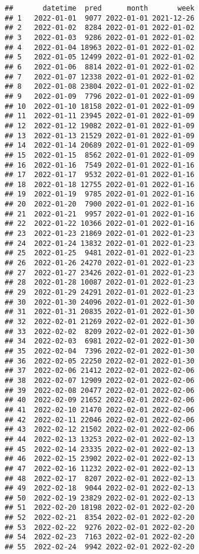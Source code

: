 \documentclass[
]{article}
\begin{document}
\begin{verbatim}
##       datetime  pred      month       week
## 1   2022-01-01  9077 2022-01-01 2021-12-26
## 2   2022-01-02  8284 2022-01-01 2022-01-02
## 3   2022-01-03  9286 2022-01-01 2022-01-02
## 4   2022-01-04 18963 2022-01-01 2022-01-02
## 5   2022-01-05 12499 2022-01-01 2022-01-02
## 6   2022-01-06  8814 2022-01-01 2022-01-02
## 7   2022-01-07 12338 2022-01-01 2022-01-02
## 8   2022-01-08 23804 2022-01-01 2022-01-02
## 9   2022-01-09  7796 2022-01-01 2022-01-09
## 10  2022-01-10 18158 2022-01-01 2022-01-09
## 11  2022-01-11 23945 2022-01-01 2022-01-09
## 12  2022-01-12 19082 2022-01-01 2022-01-09
## 13  2022-01-13 21529 2022-01-01 2022-01-09
## 14  2022-01-14 20689 2022-01-01 2022-01-09
## 15  2022-01-15  8562 2022-01-01 2022-01-09
## 16  2022-01-16  7549 2022-01-01 2022-01-16
## 17  2022-01-17  9532 2022-01-01 2022-01-16
## 18  2022-01-18 12755 2022-01-01 2022-01-16
## 19  2022-01-19  9785 2022-01-01 2022-01-16
## 20  2022-01-20  7900 2022-01-01 2022-01-16
## 21  2022-01-21  9957 2022-01-01 2022-01-16
## 22  2022-01-22 10366 2022-01-01 2022-01-16
## 23  2022-01-23 21869 2022-01-01 2022-01-23
## 24  2022-01-24 13832 2022-01-01 2022-01-23
## 25  2022-01-25  9481 2022-01-01 2022-01-23
## 26  2022-01-26 24270 2022-01-01 2022-01-23
## 27  2022-01-27 23426 2022-01-01 2022-01-23
## 28  2022-01-28 10087 2022-01-01 2022-01-23
## 29  2022-01-29 24291 2022-01-01 2022-01-23
## 30  2022-01-30 24096 2022-01-01 2022-01-30
## 31  2022-01-31 20835 2022-01-01 2022-01-30
## 32  2022-02-01 21269 2022-02-01 2022-01-30
## 33  2022-02-02  8209 2022-02-01 2022-01-30
## 34  2022-02-03  6981 2022-02-01 2022-01-30
## 35  2022-02-04  7396 2022-02-01 2022-01-30
## 36  2022-02-05 22250 2022-02-01 2022-01-30
## 37  2022-02-06 21412 2022-02-01 2022-02-06
## 38  2022-02-07 12909 2022-02-01 2022-02-06
## 39  2022-02-08 20477 2022-02-01 2022-02-06
## 40  2022-02-09 21652 2022-02-01 2022-02-06
## 41  2022-02-10 21470 2022-02-01 2022-02-06
## 42  2022-02-11 22046 2022-02-01 2022-02-06
## 43  2022-02-12 21502 2022-02-01 2022-02-06
## 44  2022-02-13 13253 2022-02-01 2022-02-13
## 45  2022-02-14 23335 2022-02-01 2022-02-13
## 46  2022-02-15 23902 2022-02-01 2022-02-13
## 47  2022-02-16 11232 2022-02-01 2022-02-13
## 48  2022-02-17  8207 2022-02-01 2022-02-13
## 49  2022-02-18  9044 2022-02-01 2022-02-13
## 50  2022-02-19 23829 2022-02-01 2022-02-13
## 51  2022-02-20 18198 2022-02-01 2022-02-20
## 52  2022-02-21  8354 2022-02-01 2022-02-20
## 53  2022-02-22  9276 2022-02-01 2022-02-20
## 54  2022-02-23  7163 2022-02-01 2022-02-20
## 55  2022-02-24  9942 2022-02-01 2022-02-20

\end{verbatim}
\end{document}
